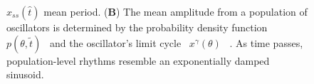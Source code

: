 \documentclass[11pt, letterpaper]{article}
\providecommand{\DIFadd}[1]{{\protect\color{blue}#1}} %
\providecommand{\DIFdel}[1]{{\protect\color{red}}}                      %
\providecommand{\DIFaddFL}[1]{\DIFadd{#1}} %
\providecommand{\DIFdelFL}[1]{\DIFdel{#1}} %
\providecommand{\DIFaddbeginFL}{} %
\providecommand{\DIFaddendFL}{} %
\providecommand{\DIFdelbeginFL}{} %
\providecommand{\DIFdelendFL}{} %
\begin{document}
\begin{figure}[tbp]
\begin{center}
{{{$\hat{x}_{ss}(\hat{t})$
}%
}\DIFdelendFL \DIFaddbeginFL \DIFaddFL{mean period}\DIFaddendFL .
({\bfseries B}) \DIFdelbeginFL \DIFdelFL{A perturbation at this phase yields a transient }\DIFdelendFL \DIFaddbeginFL \DIFaddFL{The mean }\DIFaddendFL amplitude \DIFdelbeginFL \DIFdelFL{reduction resulting }\DIFdelendFL from \DIFdelbeginFL \DIFdelFL{perturbations at the single-cell level, however,
    there is little change in population synchrony.  Population-level rhythms
    are therefore transiently damped before regaining normal amplitudes.
    (}%
\DIFdelFL{C}%
\DIFdelFL{) Oscillators are desynchronized, but with }\DIFdelendFL a \DIFdelbeginFL \DIFdelFL{transient
    increase in }\DIFdelendFL \DIFaddbeginFL \DIFaddFL{population of oscillators is determined by the probability density function \mbox{%
$p(\theta, \tilde{t})$
}%
and the oscillator's }\DIFaddendFL limit cycle \DIFdelbeginFL \DIFdelFL{amplitude}\DIFdelendFL \DIFaddbeginFL \DIFaddFL{\mbox{%
$x^\gamma(\theta)$
}%
}\DIFaddendFL .
\DIFdelbeginFL \DIFdelFL{It therefore takes some }\DIFdelendFL \DIFaddbeginFL \DIFaddFL{As }\DIFaddendFL time \DIFdelbeginFL \DIFdelFL{before the
    amplitude reduction from desynchrony is realized}\DIFdelendFL \DIFaddbeginFL \DIFaddFL{passes, population-level rhythms resemble an exponentially damped sinusoid}\DIFaddendFL .}
  \end{center}
\end{figure}
\end{document}

